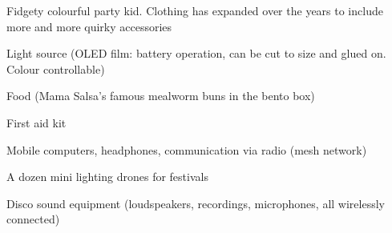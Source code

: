 \newpage
\begin{npcBox}[title=Disco continued]
    \begin{npcDescription}
    Fidgety colourful party kid. Clothing has expanded over the years to include more and more quirky accessories
    \end{npcDescription}


    \begin{equipment}
    \item Light source (OLED film: battery operation, can be cut to size and glued on. Colour controllable)
    \item Food (Mama Salsa's famous mealworm buns in the bento box)
    \item First aid kit
    \item Mobile computers, headphones, communication via radio (mesh network)
    \item A dozen mini lighting drones for festivals
    \item Disco sound equipment (loudspeakers, recordings, microphones, all wirelessly connected)
    \end{equipment}
\end{npcBox}


